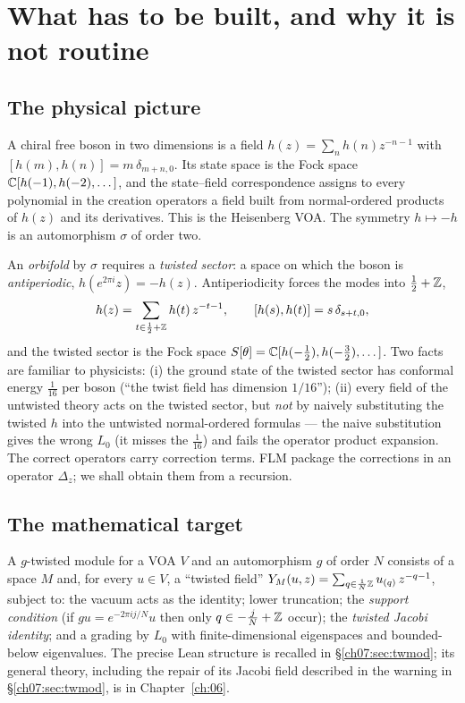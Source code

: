\section{What has to be built, and why it is not routine}\label{ch07:sec:intro}

\subsection{The physical picture}\label{ch07:sec:physics}

A chiral free boson in two dimensions is a field $h(z) = \sum_n h(n) z^{-n-1}$ with
$[h(m),h(n)] = m\,\delta_{m+n,0}$. Its state space is the Fock space ${\mathbb{C}}[h(-1),h(-2),\dots]$,
and the state--field correspondence assigns to every polynomial in the creation operators a
field built from normal-ordered products of $h(z)$ and its derivatives. This is the Heisenberg
VOA. The symmetry $h \mapsto -h$ is an automorphism $\sigma$ of order two.

An \emph{orbifold} by $\sigma$ requires a \emph{twisted sector}: a space on which the boson is
\emph{antiperiodic}, $h(e^{2\pi i}z) = -h(z)$. Antiperiodicity forces the modes into $\tfrac12+{\mathbb{Z}}$,
\begin{equation*}
  h(z) = \sum_{t\in \frac12+{\mathbb{Z}}} h(t)\,z^{-t-1}, \qquad [h(s),h(t)] = s\,\delta_{s+t,0},
\end{equation*}
and the twisted sector is the Fock space $S[\theta] = {\mathbb{C}}[h(-\tfrac12),h(-\tfrac32),\dots]$. Two
facts are familiar to physicists: (i) the ground state of the twisted sector has conformal
energy $\tfrac1{16}$ per boson (``the twist field has dimension $1/16$''); (ii) every field of
the untwisted theory acts on the twisted sector, but \emph{not} by naively substituting the
twisted $h$ into the untwisted normal-ordered formulas --- the naive substitution gives the wrong
$L_0$ (it misses the $\tfrac1{16}$) and fails the operator product expansion. The correct
operators carry correction terms. FLM package the corrections in an operator $\Delta_z$; we
shall obtain them from a recursion.

\subsection{The mathematical target}\label{ch07:sec:target}

A $g$-twisted module for a VOA $V$ and an automorphism $g$ of order $N$ consists of a space $M$
and, for every $u\in V$, a ``twisted field''
$Y_M(u,z) = \sum_{q\in \frac1N{\mathbb{Z}}} u_{(q)}\, z^{-q-1}$, subject to: the vacuum acts as the
identity; lower truncation; the \emph{support condition} (if $g u = e^{-2\pi i j/N} u$ then only
$q\in -\tfrac jN+{\mathbb{Z}}$ occur); the \emph{twisted Jacobi identity}; and a grading by $L_0$ with
finite-dimensional eigenspaces and bounded-below eigenvalues. The precise Lean structure is
recalled in \S\ref{ch07:sec:twmod}; its general theory, including the repair of its Jacobi field
described in the warning in \S\ref{ch07:sec:twmod}, is in Chapter~\ref{ch:06}.

